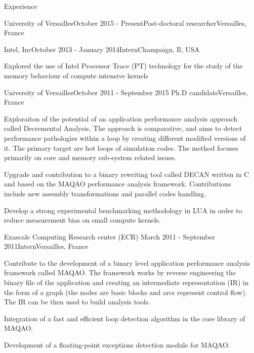 \documentclass{resume} %
\begin{document}

\begin{rSection}{Experience}

\begin{rSubsection}{University of Versailles}{October 2015 - Present}{Post-doctoral researcher}{Versailles, France}
\item  
\item 
\end{rSubsection}


\begin{rSubsection}{Intel, Inc}{October 2013 - January 2014}{Intern}{Champaign, Il, USA}
\item Explored the use of Intel Processor Trace (PT) technology for the 
      study of the memory behaviour of compute intensive kernels
\end{rSubsection}


\begin{rSubsection}{University of Versailles}{October 2011 - September 2015}
                   {Ph.D candidate}{Versailles, France}
\item Exploraiton of the potential of an application performance analysis approach
      called Decremental Analysis. The approach is comparative, and aims to detect
      performance pathologies within a loop by creating different modified versions
      of it. The primary target are hot loops of simulation codes. The method focuses 
      primarily on core and memory sub-system related issues.
\item Upgrade and contribution to a binary rewriting tool called DECAN written in C
      and based on the MAQAO performance analysis framework. Contributions include
      new assembly transformations and parallel codes handling.   
\item Develop a strong experimental benchmarking methodology in LUA in order to 
      reduce measurement bias on small compute kernels. 
\end{rSubsection}


\begin{rSubsection}{Exascale Computing Research center (ECR)}
                   {March 2011 - September 2011}{Intern}{Versailles, France}
\item Contribute to the development of a binary level application performance 
      analysis framework called MAQAO. The framework works by reverse engineering 
      the binary file of the application and creating an intermediate representation 
      (IR) in the form of a graph (the nodes are basic blocks and arcs represent 
      control flow). The IR can be then used to build analysis tools.  
\item Integration of a fast and efficient loop detection algorithm in the core 
      library of MAQAO.  
\item Development of a floating-point exceptions detection module for MAQAO.
\end{rSubsection}



\end{rSection}
\end{document}
